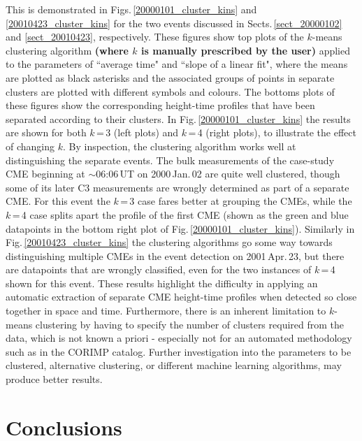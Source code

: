 \documentclass[referee,a4paper,12pt,traditabstract]{swsc}
\begin{document}
\begin{linenumbers}
This is demonstrated in Figs.\,\ref{20000101_cluster_kins} and \ref{20010423_cluster_kins} for the two events discussed in Sects.\,\ref{sect_20000102} and \ref{sect_20010423}, respectively. These figures show top plots of the $k$-means clustering algorithm {\bf (where $k$ is manually prescribed by the user)} applied to the parameters of ``average time" and ``slope of a linear fit", where the means are plotted as black asterisks and the associated groups of points in separate clusters are plotted with different symbols and colours. The bottoms plots of these figures show the corresponding height-time profiles that have been separated according to their clusters. In Fig.\,\ref{20000101_cluster_kins} the results are shown for both $k$\,=\,3 (left plots) and $k$\,=\,4 (right plots), to illustrate the effect of changing $k$. By inspection, the clustering algorithm works well at distinguishing the separate events. The bulk measurements of the case-study CME beginning at $\sim$06:06\,UT on 2000\,Jan.\,02 are quite well clustered, though some of its later C3 measurements are wrongly determined as part of a separate CME. For this event the $k$\,=\,3 case fares better at grouping the CMEs, while the $k$\,=\,4 case splits apart the profile of the first CME (shown as the green and blue datapoints in the bottom right plot of Fig.\,\ref{20000101_cluster_kins}). Similarly in Fig.\,\ref{20010423_cluster_kins} the clustering algorithms go some way towards distinguishing multiple CMEs in the event detection on 2001\,Apr.\,23, but there are datapoints that are wrongly classified, even for the two instances of $k$\,=\,4 shown for this event. These results highlight the difficulty in applying an automatic extraction of separate CME height-time profiles when detected so close together in space and time. Furthermore, there is an inherent limitation to $k$-means clustering by having to specify the number of clusters required from the data, which is not known a priori - especially not for an automated methodology such as in the CORIMP catalog. Further investigation into the parameters to be clustered, alternative clustering, or different machine learning algorithms, may produce better results.


\section{Conclusions}
\label{sect_conclusions}


\end{linenumbers}
\end{document}
